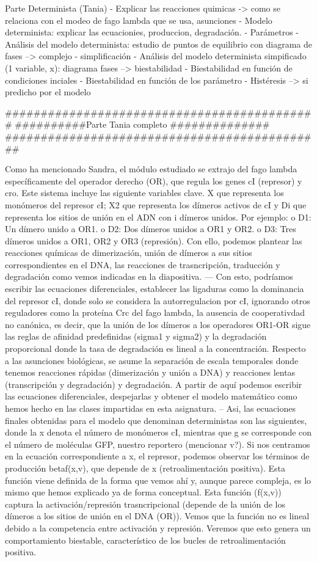 Parte Determinista (Tania)
- Explicar las reacciones quimicas -> como se relaciona con el modeo de fago lambda que se usa, asunciones
- Modelo determinista: explicar las ecuacionies, produccion, degradación.
- Parámetros
- Análisis del modelo determinista: estudio de puntos de equilibrio con diagrama de fases --> complejo - simplificación
- Análisis del modelo determinista simpificado (1 variable, x): diagrama fases --> biestabilidad
- Biestabilidad en función de condiciones inciales
- Biestabilidad en función de los parámetro
- Histéresis --> si predicho por el modelo

############################################
##########Parte Tania completo ##############
#############################################

Como ha mencionado Sandra, el módulo estudiado se extrajo del fago lambda específicamente del operador derecho (OR), que regula los genes cI (represor) y cro.
Este sistema incluye las siguiente variables clave. X que representa los monómeros del represor cI; X2 que representa los dímeros activos de cI y Di que representa los sitios de unión en el ADN con i dímeros unidos. Por ejemplo:
o	D1: Un dímero unido a OR1.
o	D2: Dos dímeros unidos a OR1 y OR2.
o	D3: Tres dímeros unidos a OR1, OR2 y OR3 (represión).
Con ello, podemos plantear las reacciones químicas de dimerización, unión de dímeros a sus sitios correspondientes en el DNA, las reacciones de trasncripción, traducción y degradación como vemos indicadas en la diapositiva.
---
Con esto, podríamos escribir las ecuaciones diferenciales, establecer las ligaduras como la dominancia del represor cI, donde solo se considera la autorregulacion por cI, ignorando otros reguladores como la proteína Crc del fago lambda, la ausencia de cooperativdad no canónica, es decir, que la unión de los dímeros a los operadores OR1-OR sigue las reglas de afinidad predefinidas (sigma1 y sigma2) y la degradación proporcional donde la tasa de degradación es lineal a la concentración. 
Respecto a las asunciones biológicas, se asume la separación de escala temporales donde tenemos reacciones rápidas (dimerización y unión a DNA) y reacciones lentas (transcripción y degradación) y degradación.
A partir de aquí podemos escribir las ecuaciones diferenciales, despejarlas y obtener el modelo matemático como hemos hecho en las clases impartidas en esta asignatura. 
--
Asi, las ecuaciones finales obtenidas para el modelo que denominan deterministas son las siguientes, donde la x denota el número de monómeros cI, mientras que g se corresponde con el número de moléculas GFP, nuestro reportero (mencionar v?). 
Si nos centramos en la ecuación correspondiente a x, el represor, podemos observar los términos de producción betaf(x,v), que depende de x (retroalimentación positiva). Esta función viene definida de la forma que vemos ahí y, aunque parece compleja, es lo mismo que hemos explicado ya de forma conceptual. Esta función (f(x,v)) captura la activación/represión trasncripcional (depende de la unión de los dímeros a los sitios de unión en el DNA (OR)). Vemos que la función no es lineal debido a la competencia entre activación y represión. Veremos que esto genera un comportamiento biestable, característico de los bucles de retroalimentación positiva.

